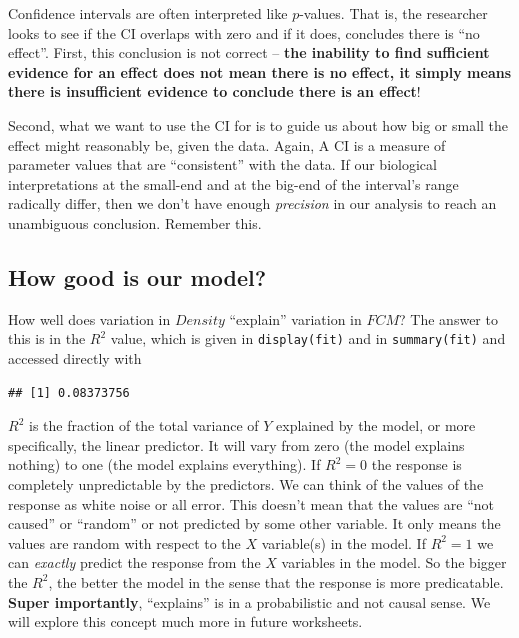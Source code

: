 \documentclass[]{book}
\newenvironment{Shaded}{\begin{snugshade}}{\end{snugshade}}
\newcommand{\KeywordTok}[1]{\textcolor[rgb]{0.13,0.29,0.53}{\textbf{#1}}}
\newcommand{\OperatorTok}[1]{\textcolor[rgb]{0.81,0.36,0.00}{\textbf{#1}}}
\newcommand{\NormalTok}[1]{#1}
\begin{document}
Confidence intervals are often interpreted like \(p\)-values. That is,
the researcher looks to see if the CI overlaps with zero and if it does,
concludes there is ``no effect''. First, this conclusion is not correct
-- \textbf{the inability to find sufficient evidence for an effect does
not mean there is no effect, it simply means there is insufficient
evidence to conclude there is an effect}!

Second, what we want to use the CI for is to guide us about how big or
small the effect might reasonably be, given the data. Again, A CI is a
measure of parameter values that are ``consistent'' with the data. If
our biological interpretations at the small-end and at the big-end of
the interval's range radically differ, then we don't have enough
\emph{precision} in our analysis to reach an unambiguous conclusion.
Remember this.

\subsection{How good is our model?}\label{how-good-is-our-model}

How well does variation in \(Density\) ``explain'' variation in \(FCM\)?
The answer to this is in the \(R^2\) value, which is given in
\texttt{display(fit)} and in \texttt{summary(fit)} and accessed directly
with

\begin{Shaded}
\end{Shaded}

\begin{verbatim}
## [1] 0.08373756
\end{verbatim}

\(R^2\) is the fraction of the total variance of \(Y\) explained by the
model, or more specifically, the linear predictor. It will vary from
zero (the model explains nothing) to one (the model explains
everything). If \(R^2=0\) the response is completely unpredictable by
the predictors. We can think of the values of the response as white
noise or all error. This doesn't mean that the values are ``not caused''
or ``random'' or not predicted by some other variable. It only means the
values are random with respect to the \(X\) variable(s) in the model. If
\(R^2=1\) we can \emph{exactly} predict the response from the \(X\)
variables in the model. So the bigger the \(R^2\), the better the model
in the sense that the response is more predicatable. \textbf{Super
importantly}, ``explains'' is in a probabilistic and not causal sense.
We will explore this concept much more in future worksheets.
\end{document}
